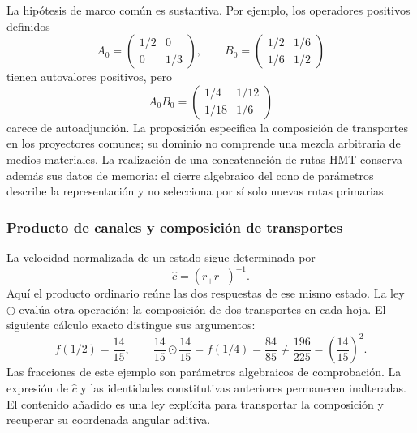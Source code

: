 La hipótesis de marco común es sustantiva. Por ejemplo, los operadores
positivos definidos
\[
 A_0=\begin{pmatrix}1/2&0\\0&1/3\end{pmatrix},\qquad
 B_0=\begin{pmatrix}1/2&1/6\\1/6&1/2\end{pmatrix}
\]
tienen autovalores positivos, pero
\[
 A_0B_0=\begin{pmatrix}1/4&1/12\\1/18&1/6\end{pmatrix}
\]
carece de autoadjunción. La proposición especifica la composición de
transportes en los proyectores comunes; su dominio no comprende una mezcla
arbitraria de medios materiales. La realización de una concatenación de
rutas HMT conserva además sus datos de memoria: el cierre algebraico del
cono de parámetros describe la representación y no selecciona por sí solo
nuevas rutas primarias.

\subsubsection{Producto de canales y composición de transportes}

La velocidad normalizada de un estado sigue determinada por
\[
 \widehat c=(r_+r_-)^{-1}.
\]
Aquí el producto ordinario reúne las dos respuestas de ese mismo estado.
La ley $\odot$ evalúa otra operación: la composición de dos transportes
en cada hoja. El siguiente cálculo exacto distingue sus argumentos:
\begin{equation}
 f(1/2)=\frac{14}{15},\qquad
 \frac{14}{15}\odot\frac{14}{15}=f(1/4)=\frac{84}{85}
 \ne\frac{196}{225}=\left(\frac{14}{15}\right)^2.
 \label{amp-comp-rational-example}
\end{equation}
Las fracciones de este ejemplo son parámetros algebraicos de comprobación.
La expresión de $\widehat c$ y las identidades constitutivas anteriores
permanecen inalteradas. El contenido añadido es una ley explícita para
transportar la composición y recuperar su coordenada angular aditiva.

